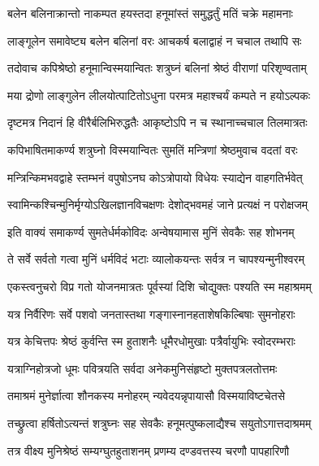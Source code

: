 \twolineshloka
{बलेन बलिनाक्रान्तो नाकम्पत हयस्तदा}
{हनूमांस्तं समुद्धर्तुं मतिं चक्रे महामनाः}%

\twolineshloka
{लाङ्गूलेन समावेष्ट्य बलेन बलिनां वरः}
{आचकर्ष बलाद्वाहं न चचाल तथापि सः}%

\twolineshloka
{तदोवाच कपिश्रेष्ठो हनूमान्विस्मयान्वितः}
{शत्रुघ्नं बलिनां श्रेष्ठं वीराणां परिशृण्वताम्}%

\twolineshloka
{मया द्रोणो लाङ्गुलेन लीलयोत्पाटितोऽधुना}
{परमत्र महाश्चर्यं कम्पते न हयोऽल्पकः}%

\twolineshloka
{दृष्टमत्र निदानं हि वीरैर्बलिभिरुद्धतैः}
{आकृष्टोऽपि न च स्थानाच्चचाल तिलमात्रतः}%

\twolineshloka
{कपिभाषितमाकर्ण्य शत्रुघ्नो विस्मयान्वितः}
{सुमतिं मन्त्रिणां श्रेष्ठमुवाच वदतां वरः}%


\twolineshloka
{मन्त्रिन्किमभवद्वाहे स्तम्भनं वपुषोऽनघ}
{कोऽत्रोपायो विधेयः स्याद्येन वाहगतिर्भवेत्}%


\twolineshloka
{स्वामिन्कश्चिन्मुनिर्मृग्योऽखिलज्ञानविचक्षणः}
{देशोद्भवमहं जाने प्रत्यक्षं न परोक्षजम्}%


\twolineshloka
{इति वाक्यं समाकर्ण्य सुमतेर्धर्मकोविदः}
{अन्वेषयामास मुनिं सेवकैः सह शोभनम्}%

\twolineshloka
{ते सर्वे सर्वतो गत्वा मुनिं धर्मविदं भटाः}
{व्यालोकयन्तः सर्वत्र न चापश्यन्मुनीश्वरम्}%

\twolineshloka
{एकस्त्वनुचरो विप्र गतो योजनमात्रतः}
{पूर्वस्यां दिशि चोद्युक्तः पश्यति स्म महाश्रमम्}%

\twolineshloka
{यत्र निर्वैरिणः सर्वे पशवो जनतास्तथा}
{गङ्गास्नानहताशेषकिल्बिषाः सुमनोहराः}%

\twolineshloka
{यत्र केचित्तपः श्रेष्ठं कुर्वन्ति स्म हुताशनैः}
{धूमैरधोमुखाः पत्रैर्वायुभिः स्वोदरम्भराः}%

\twolineshloka
{यत्राग्निहोत्रजो धूमः पवित्रयति सर्वदा}
{अनेकमुनिसंहृष्टो मुक्तपत्रलतोत्तमः}%

\twolineshloka
{तमाश्रमं मुनेर्ज्ञात्वा शौनकस्य मनोहरम्}
{न्यवेदयन्नृपायासौ विस्मयाविष्टचेतसे}%

\twolineshloka
{तच्छ्रुत्वा हर्षितोऽत्यन्तं शत्रुघ्नः सह सेवकैः}
{हनूमत्पुष्कलाद्यैश्च सयुतोऽगात्तदाश्रमम्}%

\twolineshloka
{तत्र वीक्ष्य मुनिश्रेष्ठं सम्यग्घुतहुताशनम्}
{प्रणम्य दण्डवत्तस्य चरणौ पापहारिणौ}%

